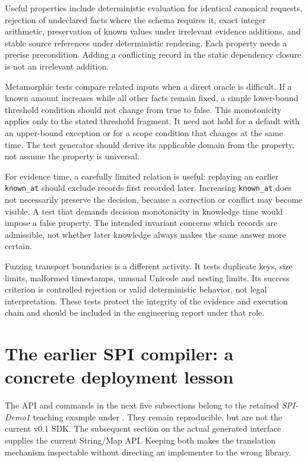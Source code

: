 \documentclass[12pt,a4paper,oneside,openany]{book}
\begin{document}
Useful properties include deterministic evaluation for identical canonical
requests, rejection of undeclared facts where the schema requires it, exact
integer arithmetic, preservation of known values under irrelevant evidence
additions, and stable source references under deterministic rendering. Each
property needs a precise precondition. Adding a conflicting record in the static
dependency closure is not an irrelevant addition.

Metamorphic tests compare related inputs when a direct oracle is difficult. If a
known amount increases while all other facts remain fixed, a simple lower-bound
threshold condition should not change from true to false. This monotonicity
applies only to the stated threshold fragment. It need not hold for a default
with an upper-bound exception or for a scope condition that changes at the same
time. The test generator should derive its applicable domain from the property,
not assume the property is universal.

For evidence time, a carefully limited relation is useful: replaying an earlier
\texttt{known\_at} should exclude records first recorded later. Increasing
\texttt{known\_at} does not necessarily preserve the decision, because a correction
or conflict may become visible. A test that demands decision monotonicity in
knowledge time would impose a false property. The intended invariant concerns
which records are admissible, not whether later knowledge always makes the same
answer more certain.

Fuzzing transport boundaries is a different activity. It tests duplicate keys,
size limits, malformed timestamps, unusual Unicode and nesting limits. Its
success criterion is controlled rejection or valid deterministic behavior, not
legal interpretation. These tests protect the integrity of the evidence and
execution chain and should be included in the engineering report under that role.

\section{The earlier SPI compiler: a concrete deployment lesson}

The API and commands in the next five subsections belong to the retained
\emph{SPI-Demo1} teaching example under . They remain
reproducible, but are not the current v0.1 SDK. The subsequent section on the actual
generated interface supplies the current String/Map API. Keeping both makes the
translation mechanism inspectable without directing an implementer to the wrong
library.
\end{document}
